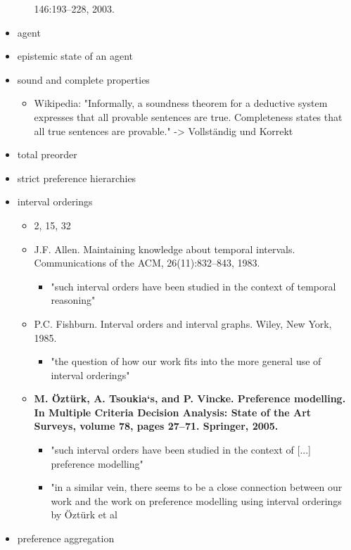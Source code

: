 \documentclass[11pt]{article}
\begin{document}
\begin{itemize}
\begin{itemize}
146:193–228, 2003.
    \end{itemize}
    \item agent
    \item epistemic state of an agent
    \item sound and complete properties
    \begin{itemize}
        \item Wikipedia: "Informally, a soundness theorem for a deductive system expresses that all provable sentences are true. Completeness states that all true sentences are provable." -> Vollständig und Korrekt
    \end{itemize}
    \item total preorder
    \item strict preference hierarchies
    \item interval orderings
    \begin{itemize}
        \item 2, 15, 32
        \item J.F. Allen. Maintaining knowledge about temporal intervals. Communications of the ACM, 26(11):832–843, 1983.
        \begin{itemize}
            \item "such interval orders have been studied in the context of temporal reasoning"
        \end{itemize}
        \item P.C. Fishburn. Interval orders and interval graphs. Wiley, New York, 1985.
        \begin{itemize}
            \item "the question of how our work fits into the more general use of interval orderings"
        \end{itemize}
        \item \textbf{M. Öztürk, A. Tsoukia`s, and P. Vincke. Preference modelling. In Multiple Criteria Decision Analysis: State of the Art Surveys, volume 78, pages 27–71. Springer, 2005.}
        \begin{itemize}
            \item "such interval orders have been studied in the context of [...] preference modelling"
            \item "in a similar vein, there seems to be a close connection between our work and the work on preference modelling using interval orderings by Öztürk et al
        \end{itemize}
    \end{itemize}
    \item preference aggregation

\end{itemize}
\end{document}

